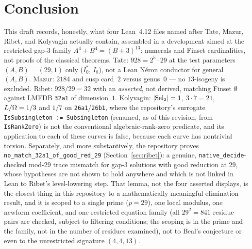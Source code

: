 \section{Conclusion}\label{sec:conc}

This draft records, honestly, what four Lean~4.12 files named
after Tate, Mazur, Ribet, and Kolyvagin actually contain, assembled
in a development aimed at the restricted gap-3 family
$A^4+B^4=(B+3)^{13}$: numerals and Finset cardinalities, not proofs
of the classical theorems. Tate: $928=2^5\cdot 29$ at the test
parameters $(A,B)=(29,1)$ only ($I_0^*$, $I_8$), not a Lean N\'eron
conductor for general $(A,B)$. Mazur: $2184$ and cusp card~$2$
versus genus~$0$ --- no $13$-isogeny is excluded. Ribet:
$928/29=32$ with an \emph{asserted}, not derived, matching Finset
$\emptyset$ against LMFDB \texttt{32a1} of dimension~$1$. Kolyvagin:
$\lvert\mathrm{Sel}_2\rvert=1$, $3\cdot 7=21$, $L/\Omega=1/3$ and $1/7$ on
\texttt{26a1}/\texttt{26b1}, where the repository's surrogate
\texttt{IsSubsingleton := Subsingleton} (renamed, as of this
revision, from \texttt{IsRankZero}) is not the conventional
algebraic-rank-zero predicate, and its application to each of these
curves is false, because each curve has nontrivial torsion.
Separately, and more substantively, the repository proves
\texttt{no\_match\_32a1\_of\_good\_red\_29}
(Section~\ref{sec:ribet}): a genuine, \texttt{native\_decide}-checked
mod-$29$ trace mismatch for gap-3 solutions with good reduction at
$29$, whose hypotheses are not shown to hold anywhere and which is
not linked in Lean to Ribet's level-lowering step. That lemma, not
the four asserted displays, is the closest thing in this repository
to a mathematically meaningful elimination result, and it is
scoped to a single prime ($p=29$), one local modulus, one newform
coefficient, and one restricted equation family (all $29^2=841$
residue pairs are checked, subject to filtering conditions; the
scoping is in the prime and the family, not in the number of
residues examined), not to Beal's conjecture or even to the
unrestricted signature $(4,4,13)$.

